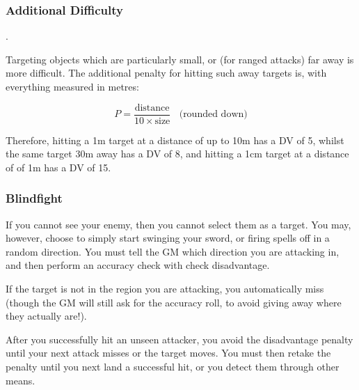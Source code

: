 \subsubsection{Additional Difficulty} \label{S:HardToHit}.

Targeting objects which are particularly small, or (for ranged attacks) far away is more difficult.  The additional penalty for hitting such away targets is, with everything measured in metres:

$$ P = \frac{\text{distance}}{10 \times \text{size}} ~~~~ \text{(rounded down)}$$

Therefore, hitting a 1m target at a distance of up to 10m has a DV of 5, whilst the same target 30m away has a DV of 8, and hitting a 1cm target at a distance of of 1m has a DV of 15. 

\subsubsection{Blindfight}\label{S:Unseen}

If you cannot see your enemy, then you cannot select them as a target. You may, however, choose to simply start swinging your sword, or firing spells off in a random direction. You must tell the GM which direction you are attacking in, and then perform an accuracy check with check disadvantage.

If the target is not in the region  you are attacking, you automatically miss (though the GM will still ask for the accuracy roll, to avoid giving away where they actually are!). 

After you successfully hit an unseen attacker, you avoid the disadvantage penalty until your next attack misses or the target moves. You must then retake the penalty until you next land a successful hit, or you detect them through other means. 
